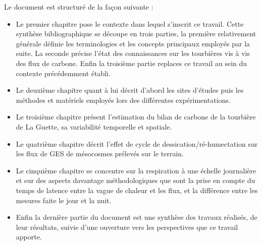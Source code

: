 Le document est structuré de la façon suivante :
\begin{itemize}
\item Le premier chapitre pose le contexte dans lequel s'inscrit ce travail.
Cette synthèse bibliographique se découpe en trois parties, la première relativement générale définie les terminologies et les concepts principaux employés par la suite.
La seconde précise l'état des connaissances sur les tourbières vis à vis des flux de carbone.
Enfin la troisième partie replaces ce travail au sein du contexte précédemment établi.
\item Le deuxième chapitre quant à lui décrit d'abord les sites d'études puis les méthodes et matériels employés lors des différentes expérimentations.
\item Le troisième chapitre présent l'estimation du bilan de carbone de la tourbière de La Guette, sa variabilité temporelle et spatiale.
\item Le quatrième chapitre décrit l'effet de cycle de dessication/ré-humectation sur les flux de GES de mésocosmes prélevés sur le terrain.
\item Le cinquième chapitre se concentre sur la respiration à une échelle journalière et sur des aspects davantage méthodologiques que sont la prise en compte du temps de latence entre la vague de chaleur et les flux, et la différence entre les mesures faite le jour et la nuit.
\item Enfin la dernière partie du document est une synthèse des travaux réalisés, de leur résultats, suivie d'une ouverture vers les perspectives que ce travail apporte.
\end{itemize}

%
